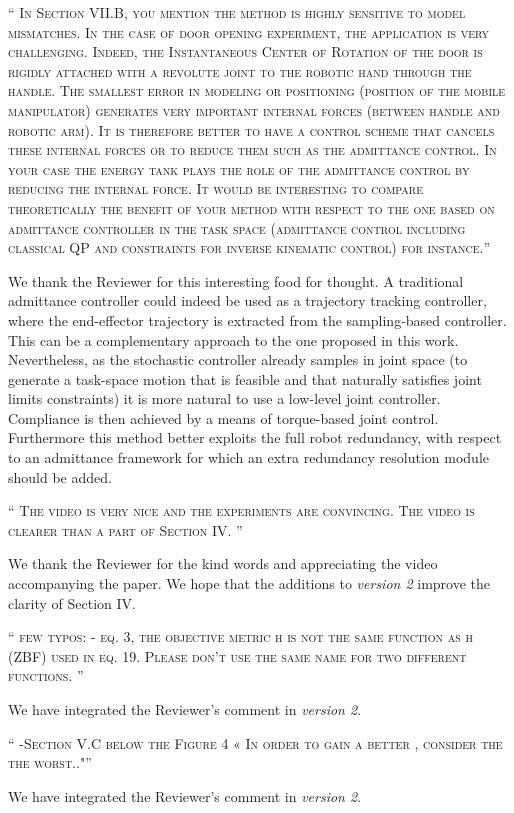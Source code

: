 \documentclass[10pt]{article}
\newcommand{\referee}[1]{\;
  \begin{minipage}[t]{.95\textwidth}
    ``{\small\color{red} \textsc{#1}}''
  \end{minipage}\medskip
  }
\newcommand{\version}[1]{\textit{version #1}}
\begin{document}
\begin{enumerate}[label={[R5:\,\arabic{enumi}]}]
\item\label{reply:R5:9} 
\referee{In Section VII.B, you mention the method is highly sensitive to model mismatches. In the case of door opening experiment, the application is very challenging. Indeed, the Instantaneous Center of Rotation of the door is rigidly attached with a revolute joint to the robotic hand through the handle. The smallest error in modeling or positioning (position of the mobile manipulator) generates very important internal forces (between handle and robotic arm). It is therefore better to have a control scheme that cancels these internal forces or to reduce them such as the admittance control. In your case the energy tank plays the role of the admittance control by reducing the internal force. It would be interesting to compare theoretically the benefit of your method with respect to the one based on admittance controller in the task space (admittance control including classical QP and constraints for inverse kinematic control) for instance.}

We thank the Reviewer for this interesting food for thought. A traditional admittance controller could indeed be used as a trajectory tracking controller, where the end-effector trajectory is extracted from the sampling-based controller. This can be a complementary approach to the one proposed in this work. Nevertheless, as the stochastic controller already samples in joint space (to generate a task-space motion that is feasible and that naturally satisfies joint limits constraints) it is more natural to use a low-level joint controller. Compliance is then achieved by a means of torque-based joint control. Furthermore this method better exploits the full robot redundancy, with respect to an admittance framework for which an extra redundancy resolution module should be added.

\item\label{reply:R5:10} 
\referee{The video is very nice and the experiments are convincing. The video is clearer than a part of Section IV. }

We thank  the Reviewer for the kind words and appreciating the video accompanying the paper. We hope that the additions to \version{2} improve the clarity of Section IV.

\item\label{reply:R5:11} 
\referee{few typos: 
- eq. 3, the objective metric h is not the same function as h (ZBF) used in eq. 19. Please don't use the same name for two different functions.  
}

We have integrated the Reviewer's comment in \version{2}.

\item\label{reply:R5:12} 
\referee{-Section V.C below the Figure 4 « In order to gain a better , consider the the worst.."}

We have integrated the Reviewer's comment in \version{2}.

\end{enumerate}
\end{document}
